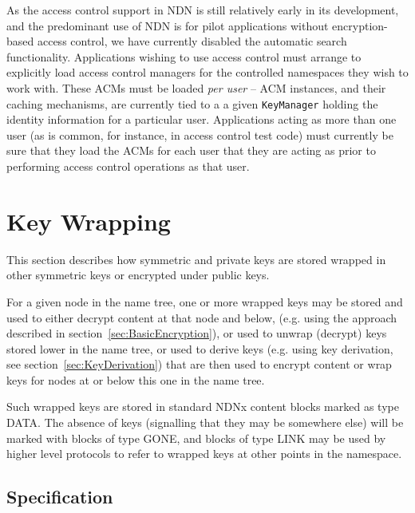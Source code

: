 As the access control support in NDN is still relatively early
in its development, and the predominant use of NDN is for pilot
applications without encryption-based access control, we have currently
disabled the automatic search functionality. Applications wishing
to use access control must arrange to explicitly load access control
managers for the controlled namespaces they wish to work with. These
ACMs must be loaded \emph{per user} -- ACM instances, and their caching
mechanisms, are currently tied to a a given {\tt KeyManager} holding the
identity information for a particular user. Applications acting as more
than one user (as is common, for instance, in access control test code) must
currently be sure that they load the ACMs for each user that they are acting
as prior to performing access control operations as that user.

\newpage

\section{Key Wrapping}
\label{sec:KeyWrapping}

This section describes how symmetric and private keys are stored
wrapped in other symmetric keys or encrypted under public keys.

For a given node in the name tree, one or more wrapped keys may be
stored and used to either decrypt content at that node and below,
(e.g. using the approach described in
section~\ref{sec:BasicEncryption}), or used to unwrap (decrypt) keys
stored lower in the name tree, or used to derive keys (e.g. using key
derivation, see section~\ref{sec:KeyDerivation}) that are then used to
encrypt content or wrap keys for nodes at or below this one in the
name tree.

Such wrapped keys are stored in standard NDNx content blocks marked as
type DATA. The absence of keys (signalling that they may be somewhere
else) will be marked with blocks of type GONE, and blocks of type LINK
may be used by higher level protocols to refer to wrapped keys at
other points in the namespace.

\subsection{Specification}

